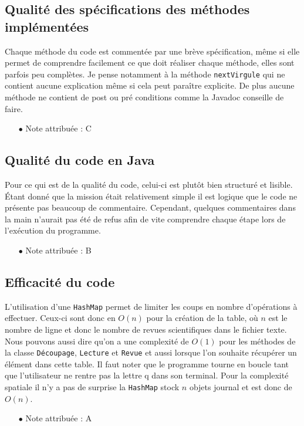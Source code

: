\documentclass[11pt]{article}
\begin{document}
\subsection{Qualité des spécifications des méthodes implémentées}

Chaque méthode du code est commentée par une brève spécification, même si elle permet de comprendre facilement ce que doit réaliser chaque méthode, elles sont parfois peu complètes. Je pense notamment à la méthode \verb+nextVirgule+ qui ne contient aucune explication même si cela peut paraître explicite. De plus aucune méthode ne contient de post ou pré conditions comme la Javadoc conseille de faire.
\\
\begin{itemize}
\item[$\bullet$] Note attribuée : C
\end{itemize}

\subsection{Qualité du code en Java}

Pour ce qui est de la qualité du code, celui-ci est plutôt bien structuré et lisible. Étant donné que la mission était relativement simple il est logique que le code ne présente pas beaucoup de commentaire. Cependant, quelques commentaires dans la main n'aurait pas été de refus afin de vite comprendre chaque étape lors de l'exécution du programme.
\\
\begin{itemize}
\item[$\bullet$] Note attribuée : B
\end{itemize}

\subsection{Efficacité du code}

L'utilisation d'une \verb+HashMap+ permet de limiter les coups en nombre d'opérations à effectuer. Ceux-ci sont donc en $O(n)$
pour la création de la table, où $n$ est le nombre de ligne et donc le nombre de revues scientifiques dans le fichier texte. Nous pouvons aussi dire qu'on a une complexité de $O(1)$ pour les méthodes de la classe \verb+Découpage+, \verb+Lecture+ et \verb+Revue+ et aussi lorsque l'on souhaite récupérer un élément dans cette table. Il faut noter que le programme tourne en boucle tant que l'utilisateur ne rentre pas la lettre q dans son terminal. Pour la complexité spatiale il n'y a pas de surprise la \verb+HashMap+ stock $n$ objets journal et est donc de $O(n)$.
\\
\begin{itemize}
\item[$\bullet$] Note attribuée : A
\end{itemize}
\end{document}
